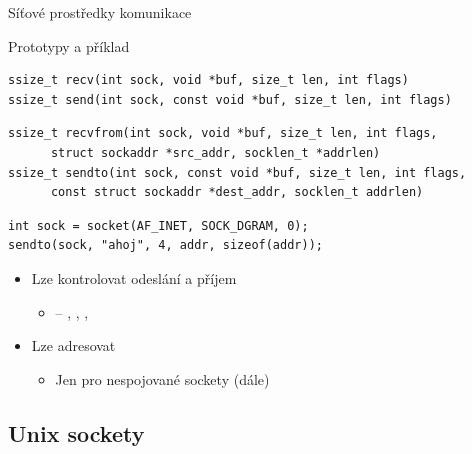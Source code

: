 \begin{frame}[fragile]{Síťové prostředky komunikace}

  \begin{block}{Prototypy a příklad}
    \begin{lstlisting}[aboveskip=2pt]
ssize_t recv(int sock, void *buf, size_t len, int flags)
ssize_t send(int sock, const void *buf, size_t len, int flags)
    \end{lstlisting}

    \begin{lstlisting}
ssize_t recvfrom(int sock, void *buf, size_t len, int flags,
      struct sockaddr *src_addr, socklen_t *addrlen)
ssize_t sendto(int sock, const void *buf, size_t len, int flags,
      const struct sockaddr *dest_addr, socklen_t addrlen)
    \end{lstlisting}


    \begin{lstlisting}[belowskip=2pt]
int sock = socket(AF_INET, SOCK_DGRAM, 0);
sendto(sock, "ahoj", 4, addr, sizeof(addr));
    \end{lstlisting}
  \end{block}


  \begin{itemize}
    \item Lze kontrolovat odeslání a příjem
    \begin{itemize}
      \item {} -- , ,
	, 
    \end{itemize}

    \pause

    \item Lze adresovat
    \begin{itemize}
      \item Jen pro nespojované sockety (dále)
    \end{itemize}
  \end{itemize}

\end{frame}


\subsection*{Unix sockety}
\frame{\subsectionpage}

